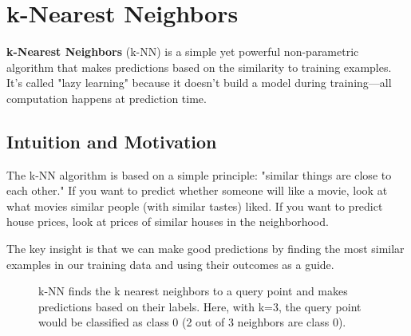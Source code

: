 
\section{k-Nearest Neighbors }
\label{sec:knn}

\textbf{k-Nearest Neighbors} (k-NN) is a simple yet powerful non-parametric algorithm that makes predictions based on the similarity to training examples. It's called "lazy learning" because it doesn't build a model during training—all computation happens at prediction time.

\subsection{Intuition and Motivation}

The k-NN algorithm is based on a simple principle: "similar things are close to each other." If you want to predict whether someone will like a movie, look at what movies similar people (with similar tastes) liked. If you want to predict house prices, look at prices of similar houses in the neighborhood.

The key insight is that we can make good predictions by finding the most similar examples in our training data and using their outcomes as a guide.

\begin{figure}[htbp]
\centering
{}
\caption{k-NN finds the k nearest neighbors to a query point and makes predictions based on their labels. Here, with k=3, the query point would be classified as class 0 (2 out of 3 neighbors are class 0).}
\label{fig:knn-example}
\end{figure}

